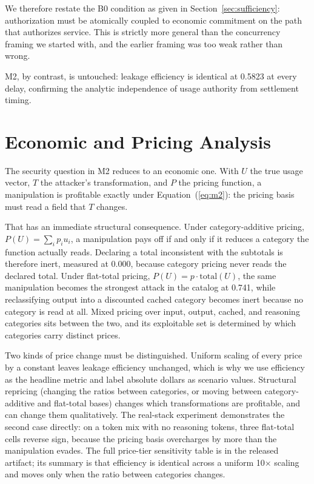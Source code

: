 \documentclass[preprint,3p,authoryear,12pt]{elsarticle}
\begin{document}
We therefore restate the B0 condition as given in Section~\ref{sec:sufficiency}:
authorization must be atomically coupled to economic commitment on the path that
authorizes service. This is strictly more general than the concurrency framing we started
with, and the earlier framing was too weak rather than wrong.

M2, by contrast, is untouched: leakage efficiency is identical at 0.5823 at every delay,
confirming the analytic independence of usage authority from settlement timing.

\section{Economic and Pricing Analysis}
\label{sec:economics}
The security question in M2 reduces to an economic one. With $U$ the true usage vector,
$T$ the attacker's transformation, and $P$ the pricing function, a manipulation is
profitable exactly under Equation~(\ref{eq:m2}): the pricing basis must read a field that
$T$ changes.

That has an immediate structural consequence. Under category-additive pricing, $P(U) =
\sum_i p_i u_i$, a manipulation pays off if and only if it reduces a category the
function actually reads. Declaring a total inconsistent with the subtotals is therefore
inert, measured at 0.000, because category pricing never reads the declared total. Under
flat-total pricing, $P(U) = p \cdot \mathrm{total}(U)$, the same manipulation becomes the
strongest attack in the catalog at 0.741, while reclassifying output into a discounted
cached category becomes inert because no category is read at all. Mixed pricing over
input, output, cached, and reasoning categories sits between the two, and its exploitable
set is determined by which categories carry distinct prices.

Two kinds of price change must be distinguished. Uniform scaling of every price by a
constant leaves leakage efficiency unchanged, which is why we use efficiency as the
headline metric and label absolute dollars as scenario values. Structural repricing
(changing the ratios between categories, or moving between category-additive and
flat-total bases) changes which transformations are profitable, and can change them
qualitatively. The real-stack experiment demonstrates the second case directly: on a
token mix with no reasoning tokens, three flat-total cells reverse sign, because the
pricing basis overcharges by more than the manipulation evades. The full price-tier
sensitivity table is in the released artifact; its summary is that efficiency is
identical across a uniform 10$\times$ scaling and moves only when the ratio between
categories changes.
\end{document}
